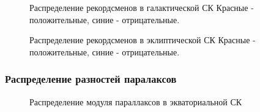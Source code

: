 \documentclass[12pt,aspectratio=43]{beamer}
\begin{document}
\begin{frame}[<alignment>]
\begin{figure}[h!]
\caption{Распределение рекордсменов в галактической СК Красные - положительные, синие - отрицательные.}
\label{img:75maxlb}
\end{figure}
\end{frame}

\begin{frame}[<alignment>]
\begin{figure}[h!]
\caption{Распределение рекордсменов в эклиптической СК Красные - положительные, синие - отрицательные.}
\label{img:75maxlonlat}
\end{figure}
\end{frame}	

\begin{frame}[<alignment>]
\frametitle{Распределение разностей паралаксов}
\begin{figure}[h!]
\caption{Распределение модуля параллаксов в экваториальной СК }
\label{img:sf_ra}
\end{figure}
\end{frame}	
\end{document}
